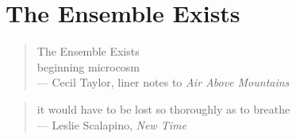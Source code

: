 \documentclass[
]{memoir}
\begin{document}
\hypertarget{the-ensemble-exists}{%
\section*{The Ensemble Exists}\label{the-ensemble-exists}}

\begin{verse}
The Ensemble Exists\\
beginning microcosm\\
— Cecil Taylor,  liner notes to \emph{Air Above Mountains}\\
\end{verse}

\begin{verse}
it would have to be lost so thoroughly as to breathe\\
— Leslie Scalapino, \emph{New Time}\\
\end{verse}
\end{document}
